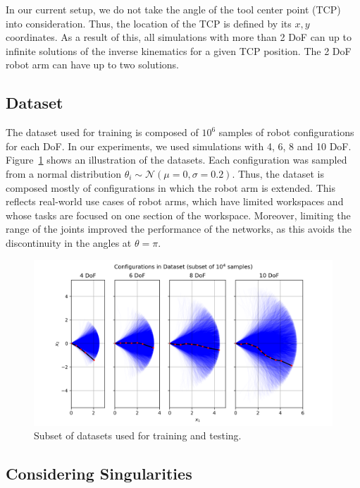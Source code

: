 \documentclass[conference]{IEEEtran}
\begin{document}
In our current setup, we do not take the angle of the tool center point (TCP) into consideration. Thus, the location of the TCP is defined by its \( x, y \) coordinates. As a result of this, all simulations with more than 2 DoF can up to infinite solutions of the inverse kinematics for a given TCP position. The 2 DoF robot arm can have up to two solutions.

\subsection*{Dataset}

The dataset used for training is composed of \( 10^6 \) samples of robot configurations for each DoF. In our experiments, we used simulations with 4, 6, 8 and 10 DoF. Figure~\ref{fig:datasets} shows an illustration of the datasets. Each configuration was sampled from a normal distribution \( \theta_i \sim \mathcal{N}(\mu=0, \sigma=0.2) \). Thus, the dataset is composed mostly of configurations in which the robot arm is extended. This reflects real-world use cases of robot arms, which have limited workspaces and whose tasks are focused on one section of the workspace. Moreover, limiting the range of the joints improved the performance of the networks, as this avoids the discontinuity in the angles at \( \theta = \pi \).

\begin{figure}[!ht]
    \centering
    \includegraphics[width=\linewidth]{figures/normal_std_0.2_all_DoF.png}
    \caption{Subset of datasets used for training and testing.}
    \label{fig:datasets} 
\end{figure}

\subsection*{Considering Singularities}
\end{document}
